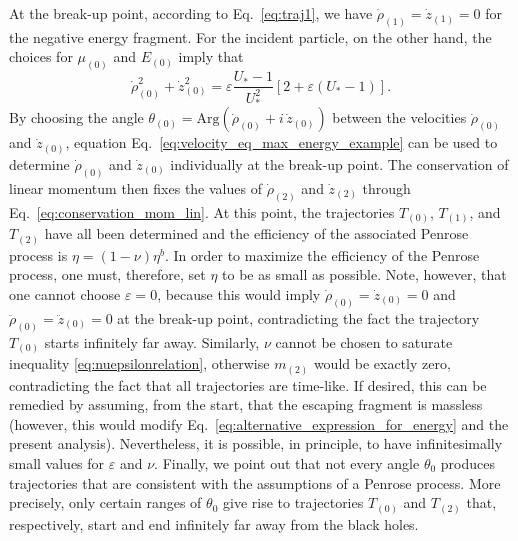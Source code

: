 At the break-up point, according to Eq.~\eqref{eq:traj1}, we have $\dot \rho_{(1)}=\dot z_{(1)} = 0$ for the negative energy fragment. For the incident particle, on the other hand, the choices for $\mu_{(0)}$ and $E_{(0)}$ imply that
%
\begin{equation}\label{eq:velocity_eq_max_energy_example}
  \dot \rho_{(0)} ^2 + \dot z_{(0)} ^2 = \varepsilon \frac{U_*-1}{U_* ^2} \left[2 + \varepsilon (U_* - 1) \right].
\end{equation}
%
By choosing the angle $\theta_{(0)} = \mathrm{Arg}\left(\dot \rho_{(0)} + i \, \dot z_{(0)} \right)$ between the velocities $\dot \rho_{(0)}$ and $\dot z_{(0)}$, equation Eq.~\eqref{eq:velocity_eq_max_energy_example} can be used to determine $\dot \rho_{(0)}$ and $\dot z_{(0)}$ individually at the break-up point. The conservation of linear momentum then fixes the values of $\dot \rho_{(2)}$ and $\dot z_{(2)}$ through Eq.~\eqref{eq:conservation_mom_lin}. At this point, the trajectories $T_{(0)}$, $T_{(1)}$, and $T_{(2)}$ have all been determined and the efficiency of the associated Penrose process is $\eta=(1-\nu)\eta^{b}$.  In order to maximize the efficiency of the Penrose process, one must, therefore, set $\eta$ to be as small as possible. Note, however, that one cannot choose $\varepsilon=0$, because this would imply $\dot \rho_{(0)} = \dot z_{(0)} = 0$ and  $\ddot \rho_{(0)} = \ddot z_{(0)} = 0$ at the break-up point, contradicting the fact the trajectory $T_{(0)}$ starts infinitely far away. Similarly, $\nu$ cannot be chosen to saturate inequality \eqref{eq:nuepsilonrelation}, otherwise $m_{(2)}$ would be exactly zero, contradicting the fact that all trajectories are time-like. If desired, this can be remedied by assuming, from the start, that the escaping fragment is massless (however, this would modify Eq.~\eqref{eq:alternative_expression_for_energy} and the present analysis). Nevertheless, it is possible, in principle, to have infinitesimally small values for $\varepsilon$ and $\nu$. Finally, we point out that not every angle $\theta_0$ produces trajectories that are consistent with the assumptions of a Penrose process. More precisely, only certain ranges of $\theta_0$ give rise to trajectories  $T_{(0)}$ and $T_{(2)}$ that, respectively, start and end infinitely far away from the black holes.

